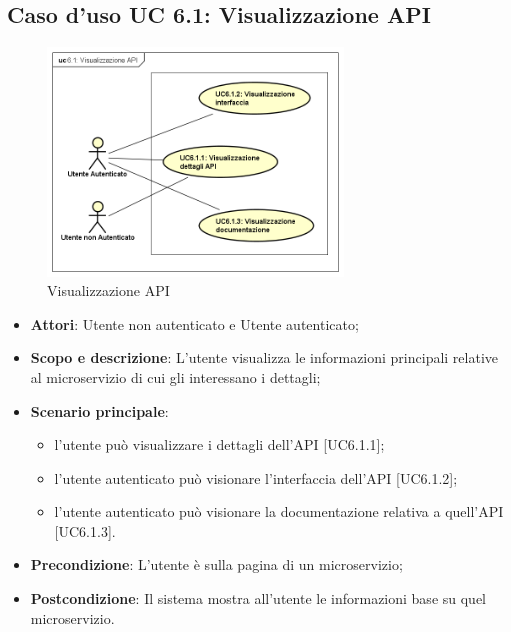 \documentclass[12pt,a4paper,titlepage]{article}
\begin{document}
	\subsection{Caso d'uso UC 6.1: Visualizzazione API}
	\label{UC6.1}
	\begin{figure}[H]
		\centering
		\includegraphics[width=0.7\textwidth]{UseCase/VisualizzazioneAPI}
		\caption{Visualizzazione API}
	\end{figure}
	\begin{itemize}
		\item \textbf{Attori}: Utente non autenticato e Utente autenticato;
		\item \textbf{Scopo e descrizione}: L'utente visualizza le informazioni principali relative al microservizio di cui gli interessano i dettagli;
		\item \textbf{Scenario principale}:
		\begin{itemize}
			\item l'utente può visualizzare i dettagli dell'API [UC6.1.1];
			\item l'utente autenticato può visionare l'interfaccia dell'API [UC6.1.2];
			\item l'utente autenticato può visionare la documentazione relativa a quell'API [UC6.1.3].
		\end{itemize}
		\item \textbf{Precondizione}: L'utente è sulla pagina di un microservizio;
		\item \textbf{Postcondizione}: Il sistema mostra all'utente le informazioni base su quel microservizio.
	\end{itemize}
\end{document}

